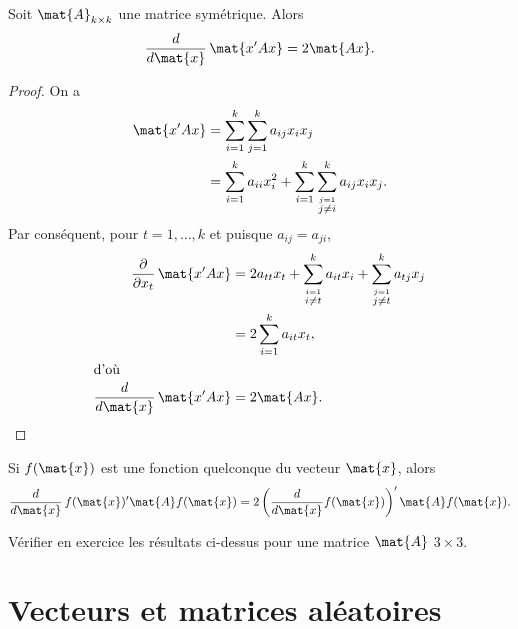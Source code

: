 \begin{thm}
  \label{thm:elements:derivee_forme_quadratique}
  Soit $\mat{A}_{k \times k}$ une matrice symétrique. Alors
  \begin{displaymath}
    \frac{d}{d \mat{x}}\, \mat{x^\prime A x} = 2 \mat{A x}.
  \end{displaymath}
\end{thm}

\begin{proof}
  On a
  \begin{align*}
    \mat{x^\prime A x}
    &= \sum_{i=1}^k \sum_{j=1}^k a_{ij} x_i x_j \\
    &= \sum_{i=1}^k a_{ii} x_i^2 +
       \sum_{i=1}^k \sum_{\overset{j=1}{j \neq i}}^k a_{ij} x_i x_j.
  \end{align*}
  Par conséquent, pour $t = 1, \dots, k$ et puisque $a_{ij} = a_{ji}$,
  \begin{align*}
    \frac{\partial}{\partial x_t}\, \mat{x^\prime A x}
    &= 2 a_{tt} x_t + \sum_{\overset{i=1}{i \neq t}}^k a_{it} x_i +
       \sum_{\overset{j=1}{j \neq t}}^k a_{tj} x_j \\
    &= 2 \sum_{i=1}^k a_{it} x_t, \\
    \intertext{d'où}
    \frac{d}{d \mat{x}}\, \mat{x^\prime A x}
    &= 2 \mat{A x}.
  \end{align*}
\end{proof}

\begin{thm}
  \label{thm:elements:derivee_fonction}
  Si $f(\mat{x})$ est une fonction quelconque du vecteur $\mat{x}$, alors
  \begin{displaymath}
    \frac{d}{d \mat{x}}\, f(\mat{x})^\prime \mat{A} f(\mat{x}) =
    2 \left( \frac{d}{d \mat{x}} f(\mat{x}) \right)^\prime \mat{A} f(\mat{x}).
  \end{displaymath}
\end{thm}

Vérifier en exercice les résultats ci-dessus pour une matrice
$\mat{A}$ $3 \times 3$.


\section{Vecteurs et matrices aléatoires}


